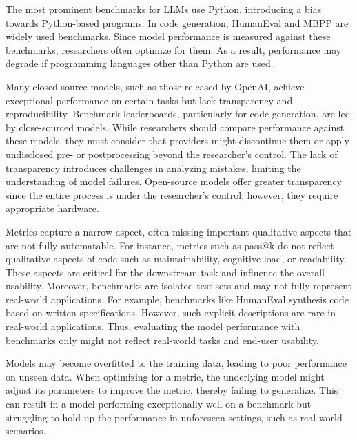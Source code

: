 \documentclass[11pt]{article}
\begin{document}
The most prominent benchmarks for LLMs use Python, introducing a bias towards Python-based programs.
In code generation, HumanEval and MBPP are widely used benchmarks.
Since model performance is measured against these benchmarks, researchers often optimize for them.
As a result, performance may degrade if programming languages other than Python are used.

Many closed-source models, such as those released by OpenAI, achieve exceptional performance on certain tasks but lack transparency and reproducibility.
Benchmark leaderboards, particularly for code generation, are led by close-sourced models.
While researchers should compare performance against these models, they must consider that providers might discontinue them or apply undisclosed pre- or postprocessing beyond the researcher's control.
The lack of transparency introduces challenges in analyzing mistakes, limiting the understanding of model failures.
Open-source models offer greater transparency since the entire process is under the researcher's control; however, they require appropriate hardware.

Metrics capture a narrow aspect, often missing important qualitative aspects that are not fully automatable.
For instance, metrics such as pass@k do not reflect qualitative aspects of code such as maintainability, cognitive load, or readability.
These aspects are critical for the downstream task and influence the overall usability.
Moreover, benchmarks are isolated test sets and may not fully represent real-world applications.
For example, benchmarks like HumanEval synthesis code based on written specifications.
However, such explicit descriptions are rare in real-world applications.
Thus, evaluating the model performance with benchmarks only might not reflect real-world tasks and end-user usability.

Models may become overfitted to the training data, leading to poor performance on unseen data.
When optimizing for a metric, the underlying model might adjust its parameters to improve the metric, thereby failing to generalize.
This can result in a model performing exceptionally well on a benchmark but struggling to hold up the performance in unforeseen settings, such as real-world scenarios.
\end{document}
